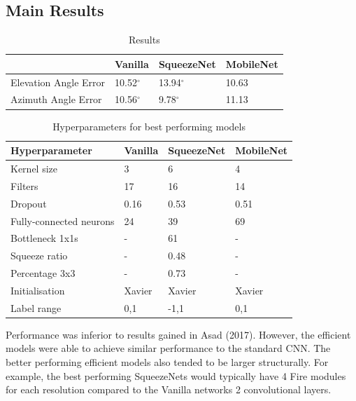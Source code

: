 \documentclass{article}
\begin{document}
{\subsection{Main Results}
\begin{table}[h!]
  \begin{center}
    \caption{Results}
    \label{tab:table1}
    \begin{tabular}{l|l|l|l}
      \textbf{} & \textbf{Vanilla} &                          \textbf{SqueezeNet} & \textbf{MobileNet}\\
      \hline
      Elevation Angle Error & 10.52$^{\circ}$ & 13.94$^{\circ}$ & 10.63\\
      Azimuth Angle Error & 10.56$^{\circ}$  & 9.78$^{\circ}$ & 11.13\\

    \end{tabular}
  \end{center}
\end{table}

\begin{table}[h!]
  \begin{center}
    \caption{Hyperparameters for best performing models}
    \label{tab:params}
    \begin{tabular}{l|l|l|l}
      \textbf{Hyperparameter} & \textbf{Vanilla} &                          \textbf{SqueezeNet} & \textbf{MobileNet}\\
      \hline
      Kernel size & 3 & 6 & 4\\
      Filters & 17 & 16 & 14\\
      Dropout & 0.16 & 0.53 & 0.51\\
      Fully-connected neurons & 24 & 39 & 69\\
      Bottleneck 1x1s & - & 61 & - \\
      Squeeze ratio & - & 0.48 & - \\
      Percentage 3x3 & - & 0.73 & - \\
      Initialisation & Xavier & Xavier & Xavier \\
      Label range & 0,1 & -1,1 & 0,1
    \end{tabular}
  \end{center}
\end{table}

Performance was inferior to results gained in Asad (2017). However, the efficient models were able to achieve similar performance to the standard CNN. The better performing efficient models also tended to be larger structurally. For example, the best performing SqueezeNets would typically have 4 Fire modules for each resolution compared to the Vanilla networks 2 convolutional layers.\\

}
\end{document}
